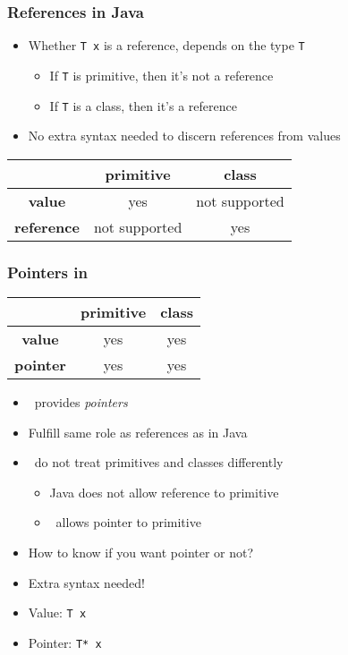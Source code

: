 \begin{frame}
  \frametitle{References in Java}
  \begin{itemize}
    \item Whether \texttt{T x} is a reference, depends on the type \texttt{T}
          \begin{itemize}
            \item If \texttt{T} is primitive, then it's not a reference
            \item If \texttt{T} is a class, then it's a reference
          \end{itemize}
    \item No extra syntax needed to discern references from values
  \end{itemize}
  \begin{center}
    \begin{tabular}{ccc}
        & \textbf{primitive} & \textbf{class} \\
      \toprule
      \textbf{value} & yes & not supported \\
      \textbf{reference} & not supported & yes \\
    \end{tabular}
  \end{center}
\end{frame}

\begin{frame}
  \frametitle{Pointers in \cpp}
  \begin{center}
    \begin{tabular}{ccc}
        & \textbf{primitive} & \textbf{class} \\
      \toprule
      \textbf{value} & yes & yes \\
      \textbf{pointer} & yes & yes \\
    \end{tabular}
  \end{center}
  \begin{itemize}
    \item \cpp\ provides \emph{pointers}
    \item Fulfill same role as references as in Java
    \item \cpp\ do not treat primitives and classes differently
          \begin{itemize}
            \item Java does not allow reference to primitive
            \item \cpp\ allows pointer to primitive
          \end{itemize}
    \item How to know if you want pointer or not?
    \item Extra syntax needed!
    \item Value: \texttt{T x}
    \item Pointer: \texttt{T* x}
  \end{itemize}
\end{frame}

